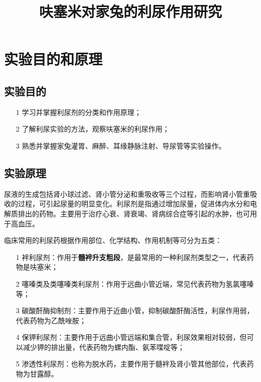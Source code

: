 \documentclass[UTF8]{ctexart}
\title{呋塞米对家兔的利尿作用研究}
\author{}
\begin{document}
\date{}
\maketitle

\section{实验目的和原理}

\subsection{实验目的}

\begin{itemize}
    \item [1] 学习并掌握利尿剂的分类和作用原理；
    \item [2] 了解利尿实验的方法，观察呋塞米的利尿作用；
    \item [3] 熟悉并掌握家兔灌胃、麻醉、耳缘静脉注射、导尿管等实验操作。
\end{itemize}

\subsection{实验原理}

尿液的生成包括肾小球过滤、肾小管分泌和重吸收等三个过程，而影响肾小管重吸收的过程，可引起尿量的明显变化。利尿剂是指通过增加尿量，促进体内水分和电解质排出的药物。主要用于治疗心衰、肾衰竭、肾病综合症等引起的水肿，也可用于高血压。

临床常用的利尿药根据作用部位、化学结构、作用机制等可分为五类：

\begin{itemize}
    \item [1] 袢利尿剂：作用于\textbf{髓袢升支粗段}，是最常用的一种利尿剂类型之一，代表药物是呋塞米；
    \item [2] 噻嗪类及类噻嗪类利尿剂：作用于远曲小管近端，常见代表药物为氢氯噻嗪等；
    \item [3] 碳酸酐酶抑制剂：主要作用于近曲小管，抑制碳酸酐酶活性，利尿作用弱，代表药物为乙酰唑胺；
    \item [4] 保钾利尿剂：主要作用于远曲小管远端和集合管，利尿效果相对较弱，但可以减少钾的排出量，代表药物为螺内酯、氨苯喋啶等；
    \item [5] 渗透性利尿剂：也称为脱水药，主要作用于髓袢及肾小管其他部位，代表药物为甘露醇。
\end{itemize}
\end{document}
